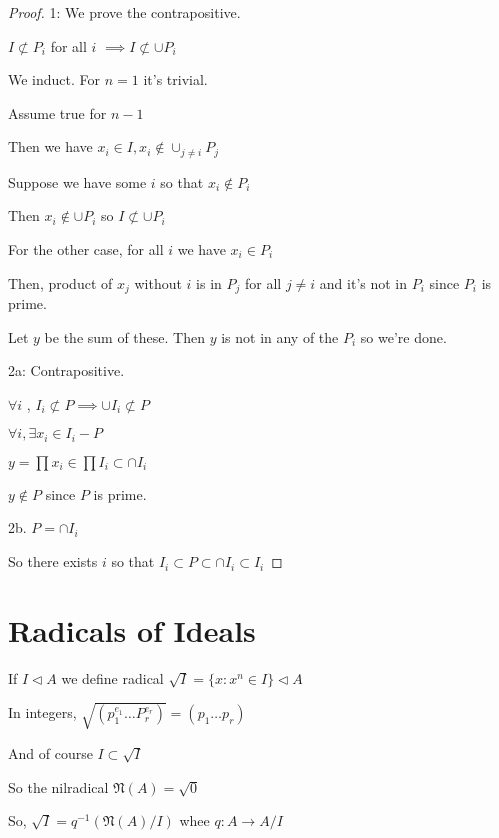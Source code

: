 \documentclass{article}
\theoremstyle{definition}
\begin{document}
\begin{proof}
    1: We prove the contrapositive.

    \(I \not \subset P_i\) for all \(i\) \(\implies I \not \subset \cup P_i\)
    
    We induct. For \(n=1\) it's trivial.

    Assume true for \(n-1\) 

    Then we have \(x_i\in I, x_i\notin \cup_{j \neq i}P_j\) 

    Suppose we have some \(i\) so that \(x_i \notin P_i\) 

    Then \(x_i\notin \cup P_i\)  so \(I\not \subset \cup P_i\)
    
    For the other case, for all \(i\) we have \(x_i\in P_i\) 

    Then, product of \(x_j\) without \(i\) is in \(P_j\) for all \(j \neq i\) and it's not in \(P_i\) since \(P_i\) is prime.

    Let \(y\) be the sum of these. Then \(y\) is not in any of the \(P_i\) so we're done.

    2a: Contrapositive.

    \(\forall i\) , \(I_i \not \subset P \implies \cup I_i \not \subset P\) 

    \(\forall i, \exists x_i\in I_i - P\)
    
    \(y = \prod x_i \in \prod I_i \subset \cap I_i\) 

    \(y\notin P\) since \(P\) is prime.

    2b. \(P = \cap I_i\) 

    So there exists \(i\) so that \(I_i \subset P \subset \cap I_i \subset I_i\)     

\end{proof}

\section*{Radicals of Ideals}

If \(I \triangleleft A\) we define radical \(\sqrt{I} = \{ x : x^n \in I \} \triangleleft A\) 

In integers, \(\sqrt{(p_1 ^{e_1}\dots P_r^{e_r})} = (p_1 \dots p_r)\) 

And of course \(I \subset \sqrt{I} \) 

So the nilradical \(\mathfrak{N} (A)= \sqrt{0} \) 

So, \(\sqrt{I} = q^{-1}(\mathfrak{N}(A) / I )\) whee \(q: A \to A / I\) 
\end{document}
